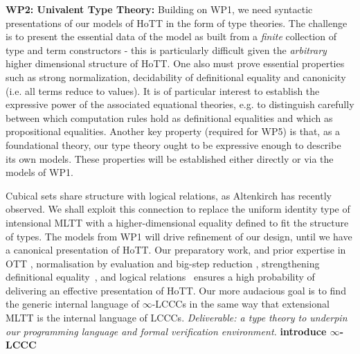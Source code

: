 \documentclass[a4paper,11pt]{article}
\begin{document}

{\bf WP2: Univalent Type Theory:} Building on WP1, we need syntactic
presentations of our models of HoTT in the form of type theories. The
challenge is to present the essential data of the model as built from
a {\em finite} collection of type and term constructors - this is
particularly difficult given the {\em arbitrary} higher dimensional
structure of HoTT. One also must prove essential properties such as strong normalization, decidability of
definitional equality and canonicity (i.e. all terms reduce to
values). It is of particular interest to establish the expressive
power of the associated equational theories, e.g. to distinguish
carefully between which computation rules hold as definitional
equalities and which as propositional equalities. Another key property
(required for WP5) is that, as a foundational theory, our type theory
ought to be expressive enough to describe its own models. These
properties will be established either directly or via the models of
WP1.





Cubical sets share structure with logical relations, as Altenkirch has
recently observed. We shall exploit this connection to replace the
uniform identity type of intensional MLTT with a
higher-dimensional equality defined to fit the structure of types. The
models from WP1 will drive refinement of our design, until we have a
canonical presentation of HoTT. Our preparatory work, and prior
expertise in OTT \cite{alti:ott-conf}, normalisation by
evaluation and big-step reduction
\cite{alti:ctcs95,alti:lics96,alti:flops04,txa:jtait}, 
strengthening definitional
equality~\cite{Allais:2013:NEN:2502409.2502411}, and logical
relations~\cite{neil2014relParamDep} ensures a high probability of delivering
an effective presentation of HoTT. Our more audacious goal is to find
the generic internal
language of $\infty$-LCCCs in the same way that extensional MLTT
is the internal language of LCCCs.  {\em Deliverable: a type theory to
  underpin our programming language and formal verification environment.} {\bf
introduce  $\infty$-LCCC} 
\end{document}
